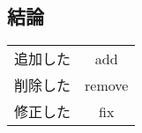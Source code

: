 \documentclass{jarticle}
\begin{document}
\subsection{結論}

\begin{table}
 \begin{center}
  \begin{tabular}{c|c}
   追加した & add \\
   削除した & remove \\
   修正した & fix \\
  \end{tabular}
 \end{center}
\end{table}
\end{document}
